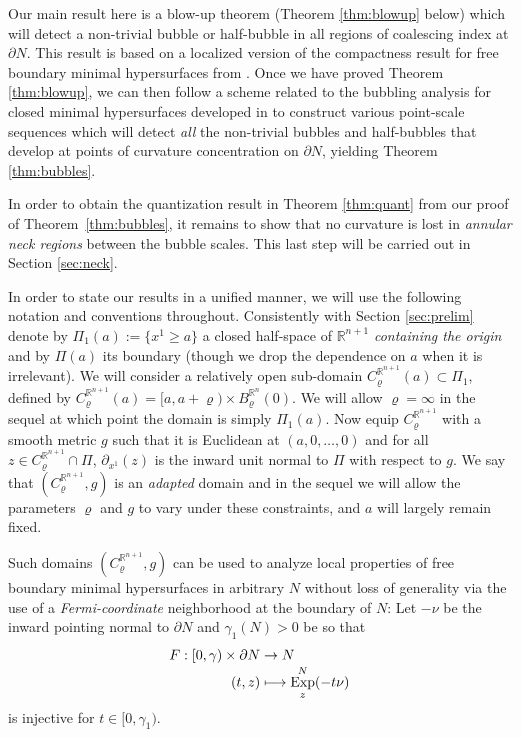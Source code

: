 \documentclass[10pt]{amsart}
\newcommand{\mto}{\mathchoice{\longmapsto}{\mapsto}{\mapsto}{\mapsto}}
\DeclareMathOperator{\Exp}{Exp}
\theoremstyle{definition}
\newcommand{\R}{\mathbb{R}}
\begin{document}
Our main result here is a blow-up theorem (Theorem \ref{thm:blowup} below) which will detect a non-trivial bubble or half-bubble in all regions of coalescing index at $\partial N$.
This result is based on a localized version of the compactness result for free boundary minimal hypersurfaces from \cite{ACS17}. Once we have proved Theorem \ref{thm:blowup}, we can then follow a scheme related to the bubbling analysis for closed minimal hypersurfaces developed in \cite[\S3]{BS17} to construct various point-scale sequences which will detect \emph{all} the non-trivial bubbles and half-bubbles that develop at points of curvature concentration on $\partial N$, yielding Theorem \ref{thm:bubbles}.

In order to obtain the quantization result in Theorem \ref{thm:quant} from our proof of Theorem~\ref{thm:bubbles}, it remains to show that no curvature is lost in \emph{annular neck regions} between the bubble scales. This last step will be carried out in Section \ref{sec:neck}.

In order to state our results in a unified manner, we will use the following notation and conventions throughout. Consistently with Section \ref{sec:prelim} denote by $\Pi_1(a):=\{x^1\geq a\}$ a closed half-space of $\R^{n+1}$ \emph{containing the origin} and by $\Pi(a)$ its boundary (though we drop the dependence on $a$ when it is irrelevant). We will consider a relatively open sub-domain $C^{\R^{n+1}}_\varrho(a)\subset \Pi_1$, defined by $C^{\R^{n+1}}_\varrho(a)=[a,a+\varrho)\times B^{\R^n}_\varrho (0)$. We will allow $\varrho=\infty$ in the sequel at which point the domain is simply $\Pi_1(a)$. Now equip $C^{\R^{n+1}}_\varrho$ with a smooth metric $g$ such that it is Euclidean at $(a,0,\dots,0)$ and for all $z\in C^{\R^{n+1}}_\varrho\cap \Pi$, $\partial_{x^1}(z)$ is the inward unit normal to $\Pi$ with respect to $g$. We say that $(C^{\R^{n+1}}_\varrho,g)$ is an \emph{adapted} domain and in the sequel we will allow the parameters $\varrho$ and $g$ to vary under these constraints, and $a$ will largely remain fixed.

Such domains $(C^{\R^{n+1}}_\varrho,g)$ can be used to analyze local properties of free boundary minimal hypersurfaces in arbitrary $N$ without loss of generality via the use of
a \emph{Fermi-coordinate} neighborhood at the boundary of $N$:
Let $-\nu$ be the inward pointing normal to $\partial N$ and $\gamma_1(N)>0$ be so that
\begin{align*}
F:[0,\gamma)\times \partial N &\to N\\[-3pt]
(t,z)&\mto \Exp^N_z (-t\nu)
\end{align*}
is injective for $t\in [0,\gamma_1)$.
\end{document}

